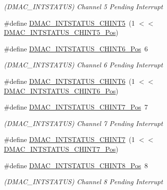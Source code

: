 \begin{DoxyCompactItemize}
\begin{DoxyCompactList}\small\item\em (D\+M\+A\+C\+\_\+\+I\+N\+T\+S\+T\+A\+T\+US) Channel 5 Pending Interrupt \end{DoxyCompactList}\item 
\#define \mbox{\hyperlink{group___s_a_m_d21___d_m_a_c_gaa3d80e7cb825e2c4f815e3ed7df929a1}{D\+M\+A\+C\+\_\+\+I\+N\+T\+S\+T\+A\+T\+U\+S\+\_\+\+C\+H\+I\+N\+T5}}~(1 $<$$<$ \mbox{\hyperlink{group___s_a_m_d21___d_m_a_c_ga5f858121c4a8fe901bdd768dcdc3e09d}{D\+M\+A\+C\+\_\+\+I\+N\+T\+S\+T\+A\+T\+U\+S\+\_\+\+C\+H\+I\+N\+T5\+\_\+\+Pos}})
\item 
\#define \mbox{\hyperlink{group___s_a_m_d21___d_m_a_c_ga57134650948080127ba00dc467522770}{D\+M\+A\+C\+\_\+\+I\+N\+T\+S\+T\+A\+T\+U\+S\+\_\+\+C\+H\+I\+N\+T6\+\_\+\+Pos}}~6
\begin{DoxyCompactList}\small\item\em (D\+M\+A\+C\+\_\+\+I\+N\+T\+S\+T\+A\+T\+US) Channel 6 Pending Interrupt \end{DoxyCompactList}\item 
\#define \mbox{\hyperlink{group___s_a_m_d21___d_m_a_c_ga9ca4014e666ad719e8e63d418d4ca88d}{D\+M\+A\+C\+\_\+\+I\+N\+T\+S\+T\+A\+T\+U\+S\+\_\+\+C\+H\+I\+N\+T6}}~(1 $<$$<$ \mbox{\hyperlink{group___s_a_m_d21___d_m_a_c_ga57134650948080127ba00dc467522770}{D\+M\+A\+C\+\_\+\+I\+N\+T\+S\+T\+A\+T\+U\+S\+\_\+\+C\+H\+I\+N\+T6\+\_\+\+Pos}})
\item 
\#define \mbox{\hyperlink{group___s_a_m_d21___d_m_a_c_ga434933267e89e51d56307c9a32334894}{D\+M\+A\+C\+\_\+\+I\+N\+T\+S\+T\+A\+T\+U\+S\+\_\+\+C\+H\+I\+N\+T7\+\_\+\+Pos}}~7
\begin{DoxyCompactList}\small\item\em (D\+M\+A\+C\+\_\+\+I\+N\+T\+S\+T\+A\+T\+US) Channel 7 Pending Interrupt \end{DoxyCompactList}\item 
\#define \mbox{\hyperlink{group___s_a_m_d21___d_m_a_c_gaed3efcf8c2e3840895748b436db627a6}{D\+M\+A\+C\+\_\+\+I\+N\+T\+S\+T\+A\+T\+U\+S\+\_\+\+C\+H\+I\+N\+T7}}~(1 $<$$<$ \mbox{\hyperlink{group___s_a_m_d21___d_m_a_c_ga434933267e89e51d56307c9a32334894}{D\+M\+A\+C\+\_\+\+I\+N\+T\+S\+T\+A\+T\+U\+S\+\_\+\+C\+H\+I\+N\+T7\+\_\+\+Pos}})
\item 
\#define \mbox{\hyperlink{group___s_a_m_d21___d_m_a_c_gaf29c31af7c0c5823b9ffe1da68514f2a}{D\+M\+A\+C\+\_\+\+I\+N\+T\+S\+T\+A\+T\+U\+S\+\_\+\+C\+H\+I\+N\+T8\+\_\+\+Pos}}~8
\begin{DoxyCompactList}\small\item\em (D\+M\+A\+C\+\_\+\+I\+N\+T\+S\+T\+A\+T\+US) Channel 8 Pending Interrupt \end{DoxyCompactList}\item 
$$
\end{DoxyCompactItemize}
